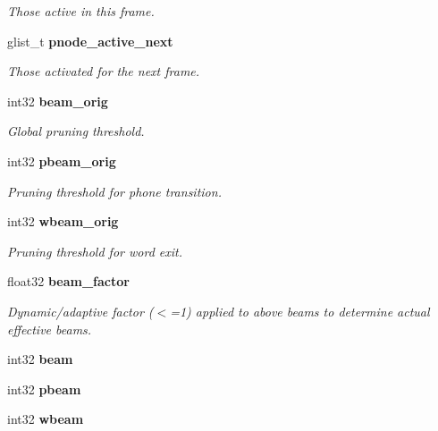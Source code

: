 \begin{DoxyCompactItemize}
\begin{DoxyCompactList}\small\item\em Those active in this frame. \end{DoxyCompactList}\item 
glist\-\_\-t {\bf pnode\-\_\-active\-\_\-next}\label{structfsg__search__s_aa2dfc00e1f34041dacd9572b0d659775}

\begin{DoxyCompactList}\small\item\em Those activated for the next frame. \end{DoxyCompactList}\item 
int32 {\bf beam\-\_\-orig}\label{structfsg__search__s_a0cdf7dc3d3eed0d37f46cb71fdea206e}

\begin{DoxyCompactList}\small\item\em Global pruning threshold. \end{DoxyCompactList}\item 
int32 {\bf pbeam\-\_\-orig}\label{structfsg__search__s_a7cdf0ab2591b95d89940d51e3ab01529}

\begin{DoxyCompactList}\small\item\em Pruning threshold for phone transition. \end{DoxyCompactList}\item 
int32 {\bf wbeam\-\_\-orig}\label{structfsg__search__s_a7f3ecc2f769143e42ed958744478db3c}

\begin{DoxyCompactList}\small\item\em Pruning threshold for word exit. \end{DoxyCompactList}\item 
float32 {\bf beam\-\_\-factor}
\begin{DoxyCompactList}\small\item\em Dynamic/adaptive factor ($<$=1) applied to above beams to determine actual effective beams. \end{DoxyCompactList}\item 
int32 {\bfseries beam}\label{structfsg__search__s_a1dbc28682f610fef5b79fd8a182f4395}

\item 
int32 {\bfseries pbeam}\label{structfsg__search__s_a373ffd62c4bcb07a6f28378ea33161e1}

\item 
int32 {\bf wbeam}\label{structfsg__search__s_af28ddecbb5115a50712c61f8a72dcf51}


\end{DoxyCompactItemize}

